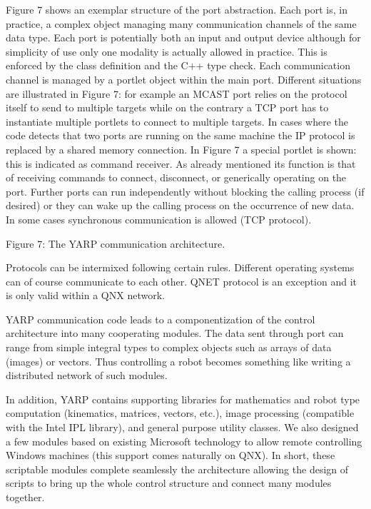 Figure 7 shows an exemplar structure of the port abstraction. Each
port is, in practice, a complex object managing many communication
channels of the same data type. Each port is potentially both an input
and output device although for simplicity of use only one modality is
actually allowed in practice. This is enforced by the class definition
and the C++ type check. Each communication channel is managed by a
portlet object within the main port. Different situations are
illustrated in Figure 7: for example an MCAST port relies on the
protocol itself to send to multiple targets while on the contrary a
TCP port has to instantiate multiple portlets to connect to multiple
targets. In cases where the code detects that two ports are running on
the same machine the IP protocol is replaced by a shared memory
connection. In Figure 7 a special portlet is shown: this is indicated
as command receiver. As already mentioned its function is that of
receiving commands to connect, disconnect, or generically operating on
the port. Further ports can run independently without blocking the
calling process (if desired) or they can wake up the calling process
on the occurrence of new data. In some cases synchronous communication
is allowed (TCP protocol).


Figure 7: The YARP communication architecture.




Protocols can be intermixed following certain rules. Different
operating systems can of course communicate to each other. QNET
protocol is an exception and it is only valid within a QNX network.

YARP communication code leads to a componentization of the control
architecture into many cooperating modules. The data sent through port
can range from simple integral types to complex objects such as arrays
of data (images) or vectors. Thus controlling a robot becomes
something like writing a distributed network of such modules.

In addition, YARP contains supporting libraries for mathematics and
robot type computation (kinematics, matrices, vectors, etc.), image
processing (compatible with the Intel IPL library), and general
purpose utility classes. We also designed a few modules based on
existing Microsoft technology to allow remote controlling Windows
machines (this support comes naturally on QNX). In short, these
scriptable modules complete seamlessly the architecture allowing the
design of scripts to bring up the whole control structure and connect
many modules together.


